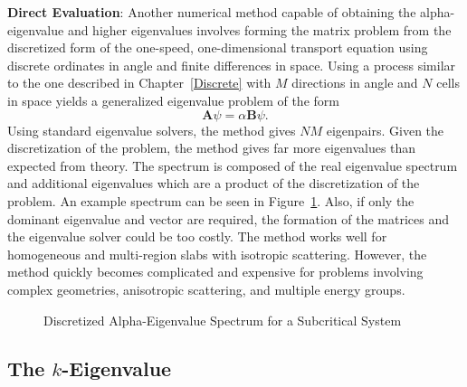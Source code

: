 \textbf{Direct Evaluation}: Another numerical method capable of obtaining the alpha-eigenvalue and higher eigenvalues involves forming the matrix problem from the discretized form of the one-speed, one-dimensional transport equation \cite{modak_simple_2003} using discrete ordinates in angle and finite differences in space. Using a process similar to the one described in Chapter~\ref{Discrete} with $M$ directions in angle and $N$ cells in space yields a generalized eigenvalue problem of the form
\begin{equation}
\mathbf{A} \psi = \alpha \mathbf{B} \psi.
\label{eq:geneig}
\end{equation}
Using standard eigenvalue solvers, the method gives $NM$ eigenpairs. Given the discretization of the problem, the method gives far more eigenvalues than expected from theory. The spectrum is composed of the real eigenvalue spectrum and additional eigenvalues which are a product of the discretization of the problem. An example spectrum can be seen in Figure~\ref{fig:NMSpec}. Also, if only the dominant eigenvalue and vector are required, the formation of the matrices and the eigenvalue solver could be too costly. The method works well for homogeneous and multi-region slabs with isotropic scattering. However, the method quickly becomes complicated and expensive for problems involving complex geometries, anisotropic scattering, and multiple energy groups.

\begin{figure}
\centering
\resizebox{0.5\textwidth}{!}{
	
	}
	\caption{Discretized Alpha-Eigenvalue Spectrum for a Subcritical System}
	\label{fig:NMSpec}
\end{figure}

\subsection{The $k$-Eigenvalue}
\label{subsec:k}

